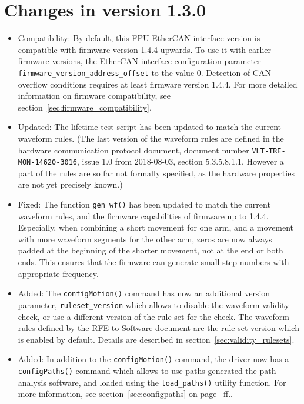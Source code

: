 \documentclass[fontsize=12,a4paper]{scrreprt}
\begin{document}
\section*{Changes in version 1.3.0}
\begin{itemize}
\item Compatibility: By default, this FPU EtherCAN interface version is compatible
  with firmware version 1.4.4 upwards. To use it with earlier firmware
  versions, the EtherCAN interface configuration parameter
  \texttt{firmware\_version\_address\_offset} to the value
  0. Detection of CAN overflow conditions requires at least firmware
  version 1.4.4. For more detailed information on firmware
  compatibility, see section~\ref{sec:firmware_compatibility}.

\item Updated: The lifetime test script has been updated to match the
  current waveform rules. (The last version of the waveform rules are
  defined in the hardware communication protocol document, document
  number \texttt{VLT-TRE-MON-14620-3016}, issue 1.0 from 2018-08-03,
  section 5.3.5.8.1.1. However a part of the rules are so far not
  formally specified, as the hardware properties are not yet precisely
  known.)

\item Fixed: The function \texttt{gen\_wf()} has been updated
  to match the current waveform rules, and the firmware
  capabilities of firmware up to 1.4.4. Especially, when
  combining a short movement for one arm, and a movement with
  more waveform segments for the other arm, zeros are now
  always padded at the beginning of the shorter movement, not
  at the end or both ends. This ensures that the firmware
  can generate small step numbers with appropriate frequency.


\item Added: The \texttt{configMotion()} command has now an additional
  version parameter, \texttt{ruleset\_version} which allows to disable
  the waveform validity check, or use a different version of the rule
  set for the check.  The waveform rules defined by the RFE to
  Software document are the rule set version which is enabled by
  default. Details are described in
  section~\ref{sec:validity_rulesets}.

\item Added: In addition to the \texttt{configMotion()} command, the
  driver now has a \texttt{configPaths()} command which allows to use
  paths generated the path analysis software, and loaded using the
  \texttt{load\_paths()} utility function. For more information, see
  section~\ref{sec:configpaths} on page~\pageref{sec:configpaths} ff..


\end{itemize}
\end{document}
